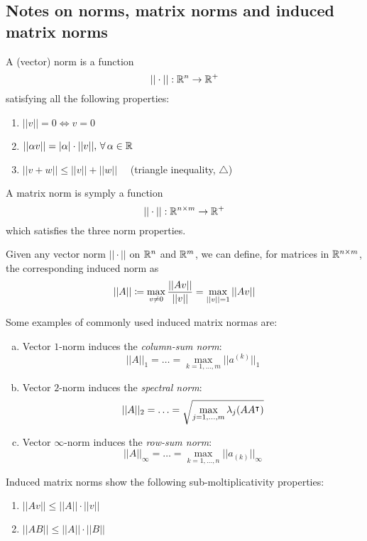 \subsection[Notes on norms]{Notes on norms, matrix norms and induced matrix norms}
\begin{Def}[Norm]
	A (vector) norm is a function
	\begin{equation*}
		||\cdot|| : \mathbb{R}^n \to \mathbb{R}^+
	\end{equation*}
	satisfying all the following properties:
	\begin{enumerate}
		\item $||v|| = 0 \iff v = 0$
		\item $||\alpha v|| = |\alpha|\cdot||v||,\,\forall\, \alpha \in \mathbb{R}$
		\item $||v + w|| \leq ||v|| + ||w|| \quad$ (triangle inequality, $\triangle$)
	\end{enumerate}
\end{Def}
\begin{Def}
	A matrix norm is symply a function
	\begin{equation*}
		||\cdot|| : \mathbb{R}^{n \times m} \to \mathbb{R}^+
	\end{equation*}
	which satisfies the three norm properties.
\end{Def}
\begin{Def}
	Given any vector norm $||\cdot||$ on $\mathbb{R}^n$ and $\mathbb{R}^m$, we can define, for matrices in $\mathbb{R}^{n \times m}$, the corresponding induced norm as
	\begin{dmath*}
		||A|| \definedas \max_{v \neq 0} \frac{||Av||}{||v||} = \max_{||v|| = 1} ||Av||
	\end{dmath*}
\end{Def}
\begin{Ex}
Some examples of commonly used induced matrix normas are:
\begin{enumerate}[(a)]
	\item 	Vector $1$-norm induces the \emph{column-sum norm}:
	\begin{dmath*}
		||A||_1 = \ldots = \max_{k=1,\ldots,m} ||a^{(k)}||_1
	\end{dmath*}
	\item 	Vector $2$-norm induces the \emph{spectral norm}:
	\begin{dmath*}
		||A||_2 = \ldots = \sqrt{\max_{j=1,\ldots,m} \lambda_j (AA\t)}
	\end{dmath*}
	\item 	Vector $\infty$-norm induces the \emph{row-sum norm}:
	\begin{dmath*}
		||A||_\infty = \ldots = \max_{k=1,\ldots,n} ||a_{(k)}||_\infty
	\end{dmath*}
\end{enumerate}
\end{Ex}
\begin{Rem}
	Induced matrix norms show the following sub-moltiplicativity properties:
	\begin{enumerate}
		\item $||Av|| \leq ||A||\cdot||v||$
		\item $||AB|| \leq ||A||\cdot||B||$
	\end{enumerate}
\end{Rem}
